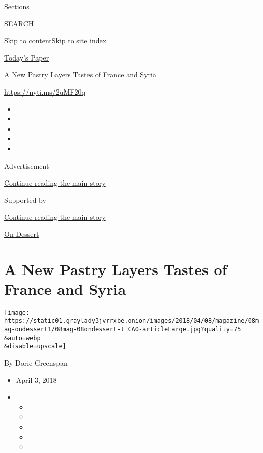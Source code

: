 Sections

SEARCH

\protect\hyperlink{site-content}{Skip to
content}\protect\hyperlink{site-index}{Skip to site index}

\href{https://myaccount.nytimes3xbfgragh.onion/auth/login?response_type=cookie\&client_id=vi}{}

\href{https://www.nytimes3xbfgragh.onion/section/todayspaper}{Today's
Paper}

A New Pastry Layers Tastes of France and Syria

\url{https://nyti.ms/2uMF20q}

\begin{itemize}
\item
\item
\item
\item
\item
\end{itemize}

Advertisement

\protect\hyperlink{after-top}{Continue reading the main story}

Supported by

\protect\hyperlink{after-sponsor}{Continue reading the main story}

\href{/column/on-dessert}{On Dessert}

\hypertarget{a-new-pastry-layers-tastes-of-france-and-syria}{%
\section{A New Pastry Layers Tastes of France and
Syria}\label{a-new-pastry-layers-tastes-of-france-and-syria}}

\texttt{[image: https://static01.graylady3jvrrxbe.onion/images/2018/04/08/magazine/08mag-ondessert1/08mag-08ondessert-t\_CA0-articleLarge.jpg?quality=75\\\&auto=webp\\\&disable=upscale]}

By Dorie Greenspan

\begin{itemize}
\item
  April 3, 2018
\item
  \begin{itemize}
  \item
  \item
  \item
  \item
  \item
  \end{itemize}
\end{itemize}

